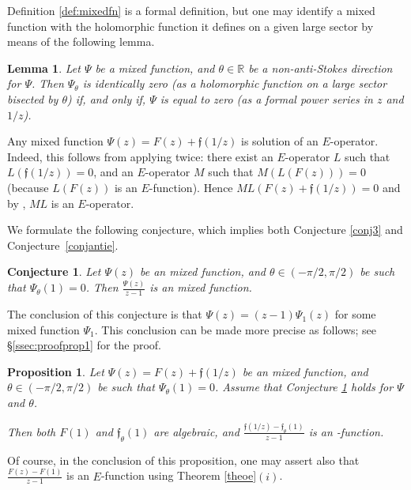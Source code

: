 \documentclass[reqno,12pt]{article}
\numberwithin{equation}{section}
\newtheorem{conj}{Conjecture}
\newtheorem{prop}{Proposition}
\newtheorem{lem}{Lemma}
\theoremstyle{remark}
\newcommand{\R}{\mathbb{R}}
\newcommand{\tantie}{\foreignlanguage{russian}{\CYREREV}}
\newcommand{\antie}{\text{\tantie}}
\newcommand{\fgo}{\mathfrak{f}}
\begin{document}
\medskip

Definition \ref{def:mixedfn} is a formal definition, but one may identify a mixed function with the holomorphic function it defines on a given large sector by means of the following lemma.

\begin{lem} \label{lemunicite} Let $\Psi$ be a mixed function, and $\theta\in\R$ be a non-anti-Stokes direction for $\Psi$. Then $\Psi_\theta$ is identically zero (as a holomorphic function on a large sector bisected by $\theta$) if, and only if, $\Psi$ is equal to zero (as a formal power series in $z$ and $1/z$).
\end{lem}



\medskip

Any mixed function $\Psi(z) = F(z)+\fgo(1/z)$ is solution of an $E$-operator. Indeed, 
this follows from applying \cite[Theorem 6.1]{andre}  twice: 
there exist   an $E$-operator $L$ such that $L( \fgo (1/z))=0$, and
an $E$-operator $M$ such that $M(L(F(z)))=0$ (because   $L(F(z))$ is an $E$-function). Hence $ML(F(z)+\fgo(1/z))=0$ and
 by \cite[p. 720, \S 4.1]{andre}, $ML$ is an $E$-operator.

\medskip

We formulate the following  conjecture, which implies both Conjecture \ref{conj3} and Conjecture~\ref{conjantie}.

\begin{conj}\label{conj1} Let $\Psi(z) $ be an mixed function, and $\theta\in (-\pi/2,\pi/2)$ be such that $\Psi_\theta(1)=0$.
Then $\frac{\Psi(z)}{z-1}$ is an mixed function.
\end{conj}

The conclusion of this conjecture is that $\Psi(z) = (z-1)   \Psi_1(z)$ for some mixed function $  \Psi_1$. This conclusion can be made more precise as follows; see \S\ref{ssec:proofprop1} for the proof.


\begin{prop}\label{prop1} Let $\Psi(z) = F(z)+\fgo(1/z)$ be an mixed function, and $\theta\in (-\pi/2,\pi/2)$ be such that $\Psi_\theta(1)=0$.
Assume that Conjecture \ref{conj1} holds for $\Psi$ and $\theta$. 

Then both $F(1)$ and $\fgo_\theta(1)$ are algebraic, and $\frac{  \fgo(1/z)  - \fgo_\theta(1) }{z-1} $ is an \antie-function.
\end{prop}
Of course, in the conclusion of this proposition, one may assert also that $\frac{  F(z)  -F(1) }{z-1} $  is an $E$-function using Theorem \ref{theoe}$(i)$.
\end{document}
